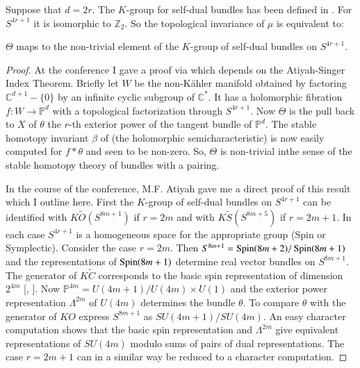Suppose that $d=2r$. The $K$-group for self-dual bundles has been
defined in \cite[p. 636]{chap7-key1}. For $S^{4r+1}$ it is isomorphic
to $\mathbb{Z}_{2}$. So the topological invariance of $\mu$ is
equivalent to:

\begin{theorem}\label{chap7-thm5.1}
$\Theta$ maps to the non-trivial element of the $K$-group of self-dual
bundles on $S^{4r+1}$.
\end{theorem}

\begin{proof}
At the conference I gave a proof via \cite[Theorem 4.2]{chap7-key3}
 which depends on the Atiyah-Singer Index
Theorem. Briefly let $W$ be the non-K\"ahler manifold obtained by
factoring $\mathbb{C}^{d+1}-\{0\}$ by an infinite cyclic subgroup of
$\mathbb{C}^{*}$. It has a holomorphic fibration
$f:W\to \mathbb{P}^{d}$ with a topological factorization through
$S^{4r+1}$. Now $\Theta$ is the pull back to $X$ of $\theta$ the
$r$-th exterior power of the tangent bundle of $\mathbb{P}^{d}$. The
stable homotopy invariant $\beta$ of \cite{chap7-key3} (the
holomorphic semicharacteristic) is now easily computed for
$f\ast \theta$ and seen to be non-zero. So, $\Theta$ is non-trivial
 in\pageoriginale the sense of the stable homotopy theory of bundles
 with a pairing.

In the course of the conference, M.F. Atiyah gave me a direct proof of
this result which I outline here. First the $K$-group of self-dual
bundles on $S^{4r+1}$ can be identified with
$K\widetilde{O}(S^{8m+1})$ if $r=2m$ and with
$K\widetilde{S}(S^{8m+5})$ if $r=2m+1$. In each case $S^{4r+1}$ is a
homogeneous space for the appropriate group (Spin or
Symplectic). Consider the case $r=2m$. Then $S^{8m+1}=\operatorname{Spin}
(8m+2)/\operatorname{Spin} (8m+1)$ and the representations of $\operatorname{Spin} (8m+1)$
determine real vector bundles on $S^{8m+1}$. The generator of
$K\widetilde{C}$ corresponds to the basic spin representation of
dimension $2^{4m}$ [\cite{chap7-key2}, \cite[p.270]{chap7-key7}]. Now
$\mathbb{P}^{4m}=U(4m+1)/U(4m)\times U(1)$ and the exterior power
representation $\Lambda^{2m}$ of $U(4m)$ determines the bundle
$\theta$. To compare $\theta$ with the generator of $KO$ express
$S^{8m+1}$ as $SU(4m+1)/SU(4m)$. An easy character computation shows
that the basic spin representation and $\Lambda^{2m}$ give equivalent
representations of $SU(4m)$ modulo sums of pairs of dual
representations. The case $r=2m+1$ can in a similar way be reduced to
a character computation. 
\end{proof}


